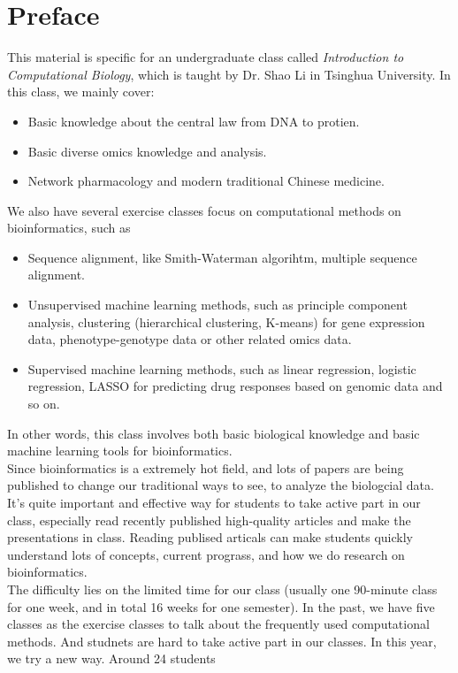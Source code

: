 \documentclass[12pt,a4paper]{book}
\begin{document}
\chapter*{Preface}
This material is specific for an undergraduate class called
{\it Introduction to Computational Biology}, which is taught by Dr. Shao Li in
Tsinghua University. In this class, we mainly cover:
\begin{itemize}
\item Basic knowledge about the central law from DNA to protien.
\item Basic diverse omics knowledge and analysis.
\item Network pharmacology and modern traditional Chinese medicine.
\end{itemize}
We also have several exercise classes focus on computational methods on
bioinformatics, such as
\begin{itemize}
\item Sequence alignment, like Smith-Waterman algorihtm, multiple
  sequence alignment.
\item Unsupervised machine learning methods, such as principle component
  analysis, clustering (hierarchical clustering, K-means) for gene expression
  data, phenotype-genotype data or other related omics data.
\item Supervised machine learning methods, such as linear regression, logistic
  regression, LASSO for predicting drug responses based on genomic data and so on.
\end{itemize}
In other words, this class involves both basic biological knowledge and basic
machine learning tools for bioinformatics. \\
Since bioinformatics is a extremely hot field, and lots of papers are being published
to change our traditional ways to see, to analyze the biologcial data. It's
quite important and effective way for students to take active part in our class,
especially read recently published high-quality articles and make the
presentations in class. Reading publised articals can make students quickly
understand lots of concepts, current prograss, and how we do research on
bioinformatics. \\
The difficulty lies on the limited time for our class (usually
one 90-minute class for one week, and in total 16 weeks for one
semester). In the past, we have five classes as the exercise classes to talk
about the frequently used computational methods. And studnets are hard to take
active part in our classes. In this year, we try a new way. Around 24 students
\end{document}
